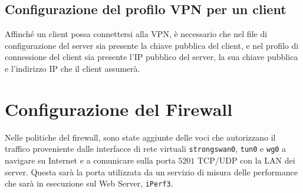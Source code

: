 \subsection{Configurazione del profilo VPN per un client}
Affinché un client possa connettersi alla VPN, è necessario che nel file di configurazione del server sia presente la chiave pubblica del client, e nel profilo di connessione del client sia presente l'IP pubblico del server, la sua chiave pubblica e l'indirizzo IP che il client assumerà.

\section{Configurazione del Firewall}
Nelle politiche del firewall, sono state aggiunte delle voci che autorizzano il traffico proveniente dalle interfacce di rete virtuali \texttt{strongswan0}, \texttt{tun0} e \texttt{wg0} a navigare su Internet e a comunicare sulla porta $5201$ TCP/UDP con la LAN dei server. Questa sarà la porta utilizzata da un servizio di misura delle performance che sarà in esecuzione sul Web Server, \texttt{iPerf3}.